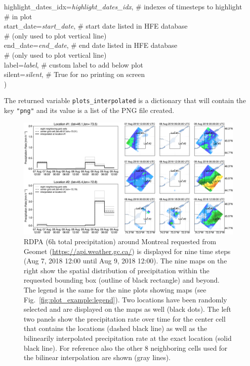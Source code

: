 \documentclass[10pt,a4paper,titlepage,parskip]{scrartcl}
\newenvironment{ttfont}{\fontfamily{\ttdefault}\selectfont}{\par}
\newcommand{\GRAU}[1]{\textcolor{ufzgray2}{#1}}
\begin{document}
\begin{framed}
\begin{ttfont}
\begin{tabbing}
			\> highlight\_dates\_idx=\textit{highlight\_dates\_idx}, \> \GRAU{\# indexes of timesteps to highlight}\\
			\> \> \GRAU{\# in plot}\\
			\> start\_date=\textit{start\_date}, \> \GRAU{\# start date listed in HFE database}\\
			\> \> \GRAU{\# (only used to plot vertical line)}\\
			\> end\_date=\textit{end\_date}, \> \GRAU{\# end date listed in HFE database}\\
			\> \> \GRAU{\# (only used to plot vertical line)}\\
			\> label=\textit{label}, \> \GRAU{\# custom label to add below plot}\\
			\> silent=\textit{silent}, \> \GRAU{\# True for no printing on screen}\\
			\> ) \> 
		\end{tabbing}
	\end{ttfont}
	\vspace*{-0.3cm}
\end{framed}
\vspace*{-0.3cm}
The returned variable \texttt{plots\_interpolated} is a dictionary that will contain the key \texttt{"png"} and its value is a list of the PNG file created. 

\begin{figure}[h!]
	\centering
	\includegraphics[width=\linewidth]{figures/test-bilinear-interpolation.png}
	\caption{RDPA (6h total precipitation) around Montreal requested from Geomet (\url{https://api.weather.gc.ca/}) is displayed for nine time steps (Aug 7, 2018 12:00 until Aug 9, 2018 12:00). The nine maps on the right show the spatial distribution of precipitation within the requested bounding box (outline of black rectangle) and beyond. The legend is the same for the nine plots showing maps (see Fig.~\ref{fig:plot_example:legend}). Two locations have been randomly selected and are displayed on the maps as well (black dots). The left two panels show the precipitation rate over time for the center cell that contains the locations (dashed black line) as well as the bilinearily interpolated precipitation rate at the exact location (solid black line). For reference also the other 8 neighboring cells used for the bilinear interpolation are shown (gray lines).}
	\label{fig:plot_example:bilinear}
\end{figure}
\end{document}
